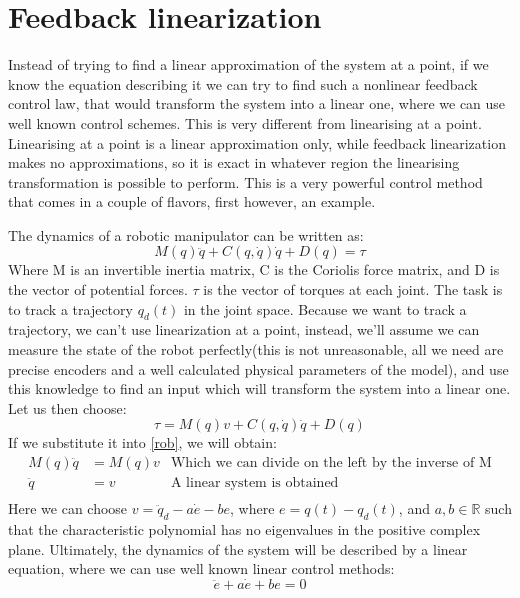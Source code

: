 \chapter{Feedback linearization}
    Instead of trying to find a linear approximation of the system at a point, if we know the equation describing it we can try to find such a nonlinear
    feedback control law, that would transform the system into a linear one, where we can use well known control schemes. This is very different from
    linearising at a point. Linearising at a point is a linear approximation only, while feedback linearization makes no approximations, so it is exact
    in whatever region the linearising transformation is possible to perform.
    This is a very powerful control method that comes in a couple of flavors, first however, an example.
    {
        The dynamics of a robotic manipulator can be written as:
        \begin{equation}
            \label{rob}
            M(q)\ddot{q}+C(q,\dot{q})\dot{q}+D(q)=\tau
        \end{equation}
        Where M is an invertible inertia matrix, C is the Coriolis force matrix, and D is the vector of potential forces. $\tau$ is the vector of
        torques at each joint. The task is to track a trajectory $q_d(t)$ in the joint space. Because we want to track a trajectory, we can't use
        linearization at a point, instead, we'll assume we can measure the state of the robot perfectly(this is not unreasonable, all we need are precise
        encoders and a well calculated physical parameters of the model), and use this knowledge to find an input which will transform the system into a linear one.
        Let us then choose:
         \begin{equation}
             \tau = M(q)v + C(q,\dot{q})\dot{q}+D(q)
        \end{equation}
        If we substitute it into \ref{rob}, we will obtain:
        \begin{equation}
            \begin{aligned}
                M(q)\ddot{q}&=M(q)v&\mbox{Which we can divide on the left by the inverse of M}\\[1.25ex]
                \ddot{q}&=v&\mbox{A linear system is obtained}\\[1.25ex]
                
            \end{aligned}
        \end{equation}
        Here we can choose $v = \ddot{q}_d - a \dot{e} - be $, where $e = q(t)-q_d(t)$, and  $a,b \in \mathbb{R}$ such that the characteristic polynomial has no 
        eigenvalues in the positive complex plane. Ultimately, the dynamics of the system will be described by a linear equation, where we can use well known
        linear control methods:
        \begin{equation}
            \ddot{e} + a \dot{e} + b e = 0
        \end{equation}

    }
